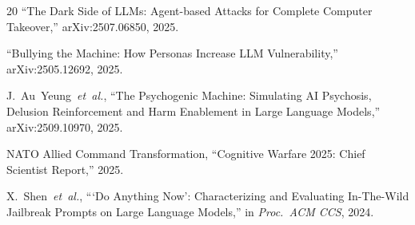 \documentclass[conference]{IEEEtran}
\begin{document}
\begin{thebibliography}{20}
``The Dark Side of LLMs: Agent-based Attacks for Complete Computer Takeover,'' arXiv:2507.06850, 2025.

``Bullying the Machine: How Personas Increase LLM Vulnerability,'' arXiv:2505.12692, 2025.

J.~Au~Yeung~\textit{et~al.}, ``The Psychogenic Machine: Simulating AI Psychosis, Delusion Reinforcement and Harm Enablement in Large Language Models,'' arXiv:2509.10970, 2025.

NATO Allied Command Transformation, ``Cognitive Warfare 2025: Chief Scientist Report,'' 2025.

X.~Shen~\textit{et~al.}, ```Do Anything Now': Characterizing and Evaluating In-The-Wild Jailbreak Prompts on Large Language Models,'' in \textit{Proc.\ ACM CCS}, 2024.

\end{thebibliography}
\end{document}
